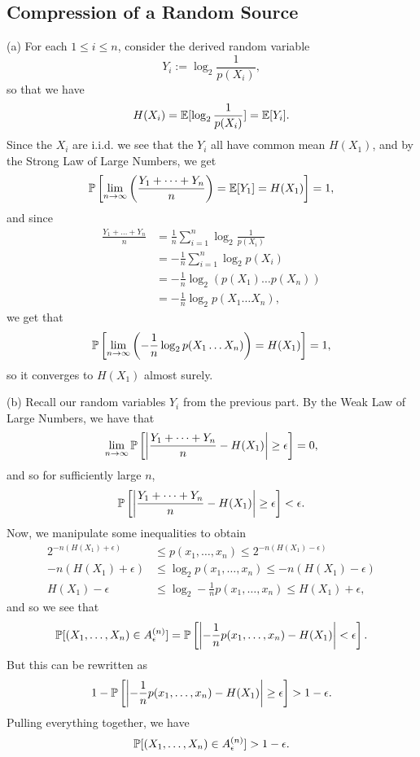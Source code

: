 \subsection{Compression of a Random Source}
(a) For each $1 \leq i \leq n$, consider the derived random variable
\[
Y_i := \log_2\frac{1}{p(X_i)},
\]
so that we have
\[
H(X_i) = \E[\log_2\frac{1}{p(X_i)}] = \E[Y_i].
\]
Since the $X_i$ are i.i.d. we see that the $Y_i$ all have common mean $H(X_1)$, and by the Strong Law of Large Numbers, we get
\begin{align*}
    \P\left[\lim_{n \to \infty}\left(\frac{Y_1 + \dots + Y_n}{n}\right) = \E[Y_1] = H(X_1)\right] = 1,
\end{align*}
and since
\begin{align*}
    \frac{Y_1 + \dots + Y_n}{n} &= \frac{1}{n}\sum_{i = 1}^n \log_2\frac{1}{p(X_i)} \\
    &= -\frac{1}{n}\sum_{i = 1}^n \log_2 p(X_i) \\
    &= -\frac{1}{n}\log_2(p(X_1) \dots p(X_n)) \\
    &= -\frac{1}{n}\log_2p(X_1 \dots X_n),
\end{align*}
we get that
\[
\P\left[\lim_{n \to \infty}\left(-\frac{1}{n}\log_2p(X_1 \dots X_n)\right) = H(X_1)\right] = 1,
\]
so it converges to $H(X_1)$ almost surely.

(b) Recall our random variables $Y_i$ from the previous part. By the Weak Law of Large Numbers, we have that
\[
\lim_{n \to \infty}\P\left[\left|\frac{Y_1 + \dots + Y_n}{n} - H(X_1)\right| \geq \epsilon\right] = 0,
\]
and so for sufficiently large $n$, 
\[
\P\left[\left|\frac{Y_1 + \dots + Y_n}{n} - H(X_1)\right| \geq \epsilon\right] < \epsilon.
\]
Now, we manipulate some inequalities to obtain
\begin{align*}
    2^{-n(H(X_1) + \epsilon)} &\leq p(x_1, \dots, x_n) \leq 2^{-n(H(X_1) - \epsilon)} \\
    -n(H(X_1) + \epsilon) &\leq \log_2 p(x_1, \dots, x_n) \leq -n(H(X_1) - \epsilon) \\
    H(X_1) - \epsilon &\leq \log_2 -\frac{1}{n}p(x_1, \dots, x_n) \leq H(X_1) + \epsilon,
\end{align*}
and so we see that
\[
\P[(X_1, \dots, X_n) \in A_{\epsilon}^{(n)}] = \P\left[\left|-\frac{1}{n}p(x_1, \dots, x_n) - H(X_1)\right| < \epsilon\right].
\]
But this can be rewritten as
\[
1 - \P\left[\left|-\frac{1}{n}p(x_1, \dots, x_n) - H(X_1)\right| \geq \epsilon\right] > 1 - \epsilon.
\]
Pulling everything together, we have
\[
\P[(X_1, \dots, X_n) \in A_{\epsilon}^{(n)}] > 1 - \epsilon.
\]

